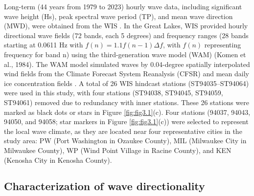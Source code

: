 Long-term (44 years from 1979 to 2023) hourly wave data, including significant wave height (Hs), peak spectral wave period (TP), and mean wave direction (MWD), were obtained from the WIS \citep{hubertz_wind-waves_1991}. In the Great Lakes, WIS provided hourly directional wave fields (72 bands, each 5 degrees) and frequency ranges (28 bands starting at 0.0611 Hz with $f(n)=1.1f(n-1)\Delta f$, with $f(n)$ representing frequency for band n) using the third-generation wave model (WAM) (Komen et al., 1984). The WAM model simulated waves by 0.04-degree spatially interpolated wind fields from the Climate Forecast System Reanalysis (CFSR) \citep{saha_ncep_2010,saha_ncep_2014} and mean daily ice concentration fields \citep{yang_consistent_2020}. A total of 26 WIS hindcast stations (ST94035–ST94064) were used in this study, with four stations (ST94038, ST94045, ST94059, ST94061) removed due to redundancy with inner stations. These 26 stations were marked as black dots or stars in Figure \ref{fig:fig3.1}(c). Four stations (94037, 94043, 94050, and 94058; star markers in Figure \ref{fig:fig3.1}(c)) were selected to represent the local wave climate, as they are located near four representative cities in the study area: PW (Port Washington in Ozaukee County), MIL (Milwaukee City in Milwaukee County), WP (Wind Point Village in Racine County), and KEN (Kenosha City in Kenosha County).

\subsection{Characterization of wave directionality}

